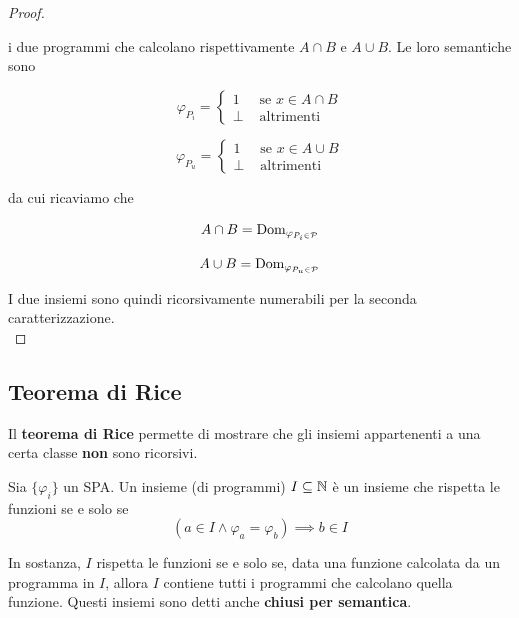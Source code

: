 \begin{proof}
\begin{center}
\begin{minipage}{.45\textwidth}
		\end{minipage}
	\end{center}
	i due programmi che calcolano rispettivamente $A \cap B$ e $A \cup B$. Le loro semantiche sono
	\begin{center}
		\begin{minipage}{0.45\textwidth}
			$$ \varphi_{P_i} = \begin{cases}
				1 & \text{ se } x \in A \cap B \\
				\bot & \text{ altrimenti}
			\end{cases}$$
		\end{minipage}
		\begin{minipage}{0.45\textwidth}
			$$ \varphi_{P_u} = \begin{cases}
				1 & \text{ se } x \in A \cup B\\
				\bot & \text{ altrimenti}
			\end{cases}$$
		\end{minipage}
	\end{center}
	da cui ricaviamo che
	\begin{center}
		\begin{minipage}{0.45\textwidth}
			$$ A \cap B = \text{Dom}_{\varphi_{P_i \in \mathcal{P}}}$$
		\end{minipage}
		\begin{minipage}{0.45\textwidth}
			$$ A \cup B = \text{Dom}_{\varphi_{P_u \in \mathcal{P}}}$$
		\end{minipage}
	\end{center}
	I due insiemi sono quindi ricorsivamente numerabili per la seconda caratterizzazione.\\
\end{proof}

\subsection{Teorema di Rice}

Il \textbf{teorema di Rice} permette di mostrare che gli insiemi appartenenti a una certa classe \textbf{non} sono ricorsivi.

Sia $\{\varphi_i\}$ un SPA. Un insieme (di programmi) $I \subseteq \mathbb{N}$ è un insieme che rispetta le funzioni se e solo se
$$ \left(a \in I \wedge \varphi_a = \varphi_b \right) \implies b \in I $$

In sostanza, $I$ rispetta le funzioni se e solo se, data una funzione calcolata da un programma in $I$, allora $I$ contiene tutti i programmi che calcolano quella funzione. Questi insiemi sono detti anche \textbf{chiusi per semantica}.

